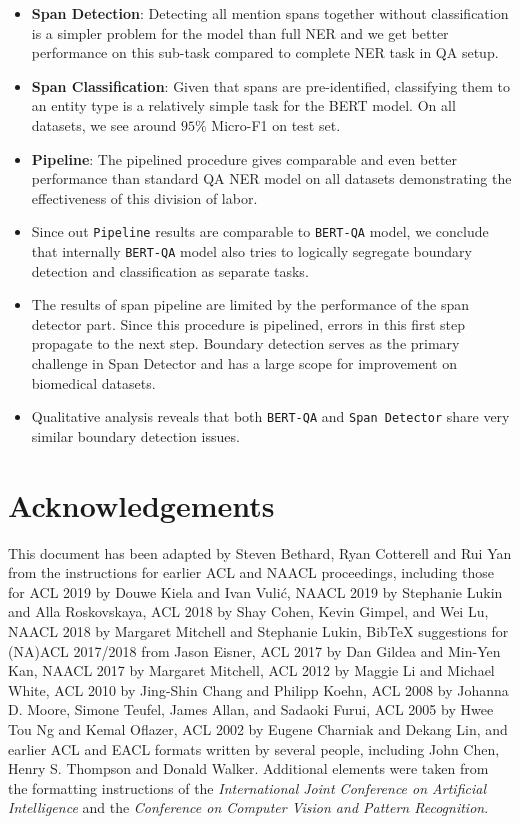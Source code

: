 \documentclass[11pt]{article}
\begin{document}
\begin{itemize}
    \item \textbf{Span Detection}: Detecting all mention spans together without classification is a simpler problem for the model than full NER and we get better performance on this sub-task compared to complete NER task in QA setup.
    
    \item \textbf{Span Classification}: Given that spans are pre-identified, classifying them to an entity type is a relatively simple task for the BERT model. On all datasets, we see around $95\%$ Micro-F1 on test set.
    
    \item \textbf{Pipeline}: The pipelined procedure gives comparable and even better performance than standard QA NER model on all datasets demonstrating the effectiveness of this division of labor. 
    
    \item Since out \texttt{Pipeline} results are comparable to \texttt{BERT-QA} model, we conclude that internally \texttt{BERT-QA} model also tries to logically segregate boundary detection and classification as separate tasks.
    
    \item The results of span pipeline are limited by the performance of the span detector part. Since this procedure is pipelined, errors in this first step propagate to the next step. Boundary detection serves as the primary challenge in Span Detector and has a large scope for improvement on biomedical datasets.
    
    \item Qualitative analysis reveals that both \texttt{BERT-QA} and \texttt{Span Detector} share very similar boundary detection issues.
\end{itemize}

\section*{Acknowledgements}

This document has been adapted
by Steven Bethard, Ryan Cotterell and Rui Yan
from the instructions for earlier ACL and NAACL proceedings, including those for 
ACL 2019 by Douwe Kiela and Ivan Vuli\'{c},
NAACL 2019 by Stephanie Lukin and Alla Roskovskaya, 
ACL 2018 by Shay Cohen, Kevin Gimpel, and Wei Lu, 
NAACL 2018 by Margaret Mitchell and Stephanie Lukin,
Bib\TeX{} suggestions for (NA)ACL 2017/2018 from Jason Eisner,
ACL 2017 by Dan Gildea and Min-Yen Kan, 
NAACL 2017 by Margaret Mitchell, 
ACL 2012 by Maggie Li and Michael White, 
ACL 2010 by Jing-Shin Chang and Philipp Koehn, 
ACL 2008 by Johanna D. Moore, Simone Teufel, James Allan, and Sadaoki Furui, 
ACL 2005 by Hwee Tou Ng and Kemal Oflazer, 
ACL 2002 by Eugene Charniak and Dekang Lin, 
and earlier ACL and EACL formats written by several people, including
John Chen, Henry S. Thompson and Donald Walker.
Additional elements were taken from the formatting instructions of the \emph{International Joint Conference on Artificial Intelligence} and the \emph{Conference on Computer Vision and Pattern Recognition}.
\end{document}
